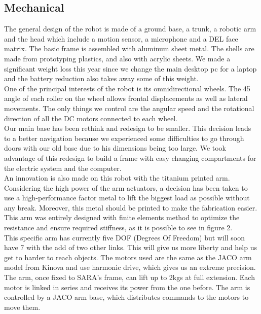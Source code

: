 \documentclass[runningheads,a4paper]{llncs}
\begin{document}
\subsection{Mechanical}
\tab The general design of the robot is made of a ground base, a trunk, a robotic arm and the head which include a motion sensor, a microphone and a DEL face matrix. The basic frame is assembled with aluminum sheet metal. The shells are made from prototyping plastics, and also with acrylic sheets. We made a significant weight loss this year since we change the main desktop pc for a laptop and the battery reduction also takes away some of this weight.  \\

One of the principal interests of the robot is its omnidirectional wheels. The 45 angle of each roller on the wheel allows frontal displacements as well as lateral movements. The only things we control are the angular speed and the rotational direction of all the DC motors connected to each wheel. \\

Our main base has been rethink and redesign to be smaller. This decision leads to a better navigation because we experienced some difficulties to go through doors with our old base due to his dimensions being too large. We took advantage of this redesign to build a frame with easy changing compartments for the electric system and the computer. \\

An innovation is also made on this robot with the titanium printed arm. Considering the high power of the arm actuators, a decision has been taken to use a high-performance factor metal to lift the biggest load as possible without any break. Moreover, this metal should be printed to make the fabrication easier. This arm was entirely designed with finite elements method to optimize the resistance and ensure required stiffness, as it is possible to see in figure 2. \\

This specific arm has currently five DOF (Degrees Of Freedom) but will soon have 7 with the add of two other links. This will give us more liberty and help us get to harder to reach objects. The motors used are the same as the JACO arm model from Kinova and use harmonic drive, which gives us an extreme precision. The arm, once fixed to SARA’s frame, can lift up to 2kgs at full extension. Each motor is linked in series and receives its power from the one before. The arm is controlled by a JACO arm base, which distributes commands to the motors to move them. \\
\end{document}
